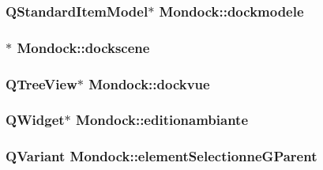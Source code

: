 \hypertarget{class_mondock_a3f46e1710907a9aedf250fce4ba93076}{
\subsubsection[{dockmodele}]{\setlength{\rightskip}{0pt plus 5cm}Q\+Standard\+Item\+Model$\ast$ Mondock\+::dockmodele}}\label{class_mondock_a3f46e1710907a9aedf250fce4ba93076}
\hypertarget{class_mondock_ac6fd15f2143e05b554f3f936e6f1588f}{
\subsubsection[{dockscene}]{$\ast$ Mondock\+::dockscene}}\label{class_mondock_ac6fd15f2143e05b554f3f936e6f1588f}
\hypertarget{class_mondock_a32e24e3ef7312fbd292740e19c3d3dcd}{
\subsubsection[{dockvue}]{\setlength{\rightskip}{0pt plus 5cm}Q\+Tree\+View$\ast$ Mondock\+::dockvue}}\label{class_mondock_a32e24e3ef7312fbd292740e19c3d3dcd}
\hypertarget{class_mondock_a958707eb3e7ab57d99934c167106dd0d}{
\subsubsection[{editionambiante}]{\setlength{\rightskip}{0pt plus 5cm}Q\+Widget$\ast$ Mondock\+::editionambiante\hspace{0.3cm}{\ttfamily [private]}}}\label{class_mondock_a958707eb3e7ab57d99934c167106dd0d}
\hypertarget{class_mondock_a3c00ae3b69dc59785835aa2d04b73392}{
\subsubsection[{element\+Selectionne\+G\+Parent}]{\setlength{\rightskip}{0pt plus 5cm}Q\+Variant Mondock\+::element\+Selectionne\+G\+Parent\hspace{0.3cm}{\ttfamily [private]}}}\label{class_mondock_a3c00ae3b69dc59785835aa2d04b73392}
